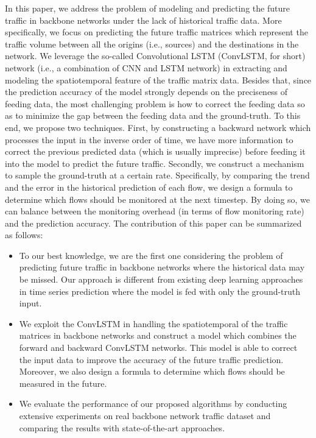 In this paper, we address the problem of modeling and predicting the future traffic in backbone networks under the lack of historical traffic data. 
More specifically, we focus on predicting the future traffic matrices which represent the traffic volume between all the origins (i.e., sources) and the destinations in the network. 
We leverage the so-called Convolutional LSTM  (ConvLSTM, for short) network \cite{xingjian2015convolutional} (i.e., a combination of CNN and LSTM network) in extracting and modeling the spatiotemporal feature of the traffic matrix data. 
Besides that, since the prediction accuracy of the model strongly depends on the preciseness of feeding data, the most challenging problem is how to correct the feeding data so as to minimize the gap between the feeding data and the ground-truth. 
To this end, we propose two techniques. First, by constructing a backward network which processes the input in the inverse order of time, we have more information to correct the previous predicted data (which is usually imprecise) before feeding it into the model to predict the future traffic. Secondly, we construct a mechanism to sample the ground-truth at a certain rate. Specifically, by comparing the trend and the error in the historical prediction of each flow, we design a formula to determine which flows should be monitored at the next timestep. By doing so, we can balance between the monitoring overhead (in terms of flow monitoring rate) and the prediction accuracy. 
The contribution of this paper can be summarized as follows:
\begin{itemize}
\item To our best knowledge, we are the first one considering the problem of predicting future traffic in backbone networks where the historical data may be missed. Our approach is different from existing deep learning approaches in time series prediction where the model is fed with only the ground-truth input.
\item We exploit the ConvLSTM in handling the spatiotemporal of the traffic matrices in backbone networks and construct a model which combines the forward and backward ConvLSTM networks. This model is able to correct the input data to improve the accuracy of the future traffic prediction. Moreover, we also design a formula to determine which flows should be measured in the future.
\item We evaluate the performance of our proposed algorithms by conducting extensive experiments on real backbone network traffic dataset and comparing the results with state-of-the-art approaches.
\end{itemize}
